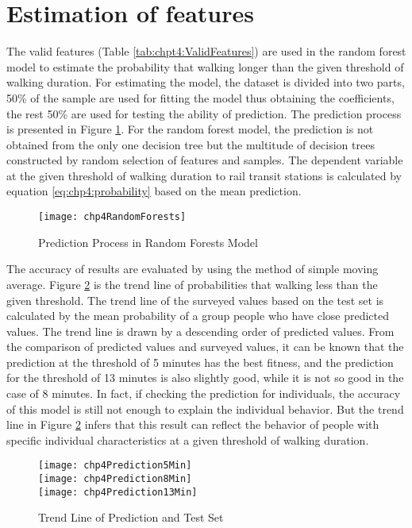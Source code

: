%
\section{Estimation of features}
The valid features (Table \ref{tab:chpt4:ValidFeatures}) are used in the random forest model to estimate the probability that walking longer than the given threshold of walking duration. For estimating the model, the dataset is divided into two parts, 50\% of the sample are used for fitting the model thus obtaining the coefficients, the rest 50\% are used for testing the ability of prediction. The prediction process is presented in Figure \ref{fig:chp4:RandomForests}. For the random forest model, the prediction is not obtained from the only one decision tree but the multitude of decision trees constructed by random selection of features and samples. The dependent variable at the given threshold of walking duration to rail transit stations is calculated by equation \ref{eq:chp4:probability} based on the mean prediction.

\begin{figure}[htp]
	\caption{Prediction Process in Random Forests Model}
	\label{fig:chp4:RandomForests}
	\centering
	\texttt{[image: chp4RandomForests]}
\end{figure}

%
The accuracy of results are evaluated by using the method of simple moving average. Figure \ref{fig:chp4:Prediction} is the trend line of probabilities that walking less than the given threshold. The trend line of the surveyed values based on the test set is calculated by the mean probability of a group people who have close predicted values. The trend line is drawn by a descending order of predicted values. From the comparison of predicted values and surveyed values, it can be known that the prediction at the threshold of 5 minutes has the best fitness, and the prediction for the threshold of 13 minutes is also slightly good, while it is not so good in the case of 8 minutes. In fact, if checking the prediction for individuals, the accuracy of this model is still not enough to explain the individual behavior. But the trend line in Figure \ref{fig:chp4:Prediction} infers that this result can reflect the behavior of people with specific individual characteristics at a given threshold of walking duration. 

\begin{figure}[htp]
	\caption{Trend Line of Prediction and Test Set}
	\label{fig:chp4:Prediction}
	\centering
	\texttt{[image: chp4Prediction5Min]}\\
	\texttt{[image: chp4Prediction8Min]}\\
	\texttt{[image: chp4Prediction13Min]}\\
\end{figure}

